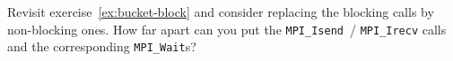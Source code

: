   \label{ex:bucket-nonblock}
  Revisit exercise~\ref{ex:bucket-block} and consider replacing the
  blocking calls by non-blocking ones. How far apart can you put the
  \lstinline{MPI_Isend}~/ \lstinline{MPI_Irecv} calls and the
  corresponding \lstinline{MPI_Wait}s?
